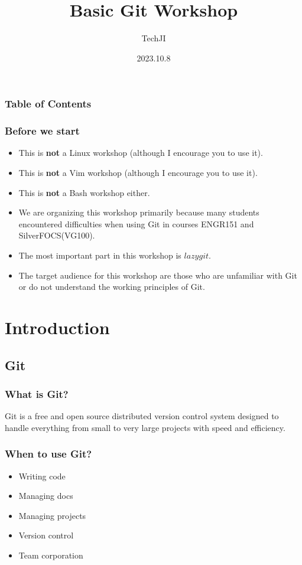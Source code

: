 \documentclass[aspectratio=169]{beamer}
\title[Course number]{Basic Git Workshop}
\author[]{TechJI}
\institute[UMJI-SJTU]
{
	University of Michigan - Shanghai Jiaotong University
	\\\medskip
	Joint Institute
}
\date{2023.10.8}
\begin{document}
\maketitle
\begin{frame}
  \frametitle{Table of Contents}
  \tableofcontents
\end{frame}

\begin{frame}
  \frametitle{Before we start}
  \begin{itemize}
      \item This is \textbf{not} a Linux workshop
          (although I encourage you to use it).
      \item This is \textbf{not} a Vim workshop
          (although I encourage you to use it).
      \item This is \textbf{not} a Bash workshop either.
      \item We are organizing this workshop primarily because many students encountered difficulties when using Git in courses ENGR151 and SilverFOCS(VG100).
      \item The most important part in this workshop is $lazygit$.
      \item The target audience for this workshop are those who are unfamiliar with Git or do not understand the working principles of Git.
  \end{itemize}
\end{frame}

\section{Introduction}
\subsection{Git}
\begin{frame}
  \frametitle{What is Git?}
  Git is a free and open source distributed version control system designed to handle everything from small to very large projects with speed and efficiency.
\end{frame}

\begin{frame}
  \frametitle{When to use Git?}

  \begin{itemize}
    \item Writing code
    \item Managing docs
    \item Managing projects
    \item Version control
    \item Team corporation
  \end{itemize}

\end{frame}
\end{document}
